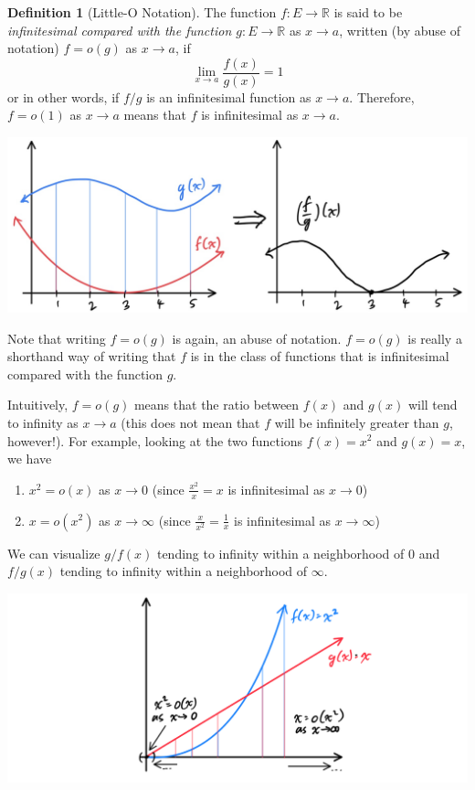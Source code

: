 \documentclass{article}
\theoremstyle{remark}
\theoremstyle{definition}
\newtheorem{definition}{Definition}[section]
\begin{document}
\begin{definition}[Little-O Notation]
The function $f: E \longrightarrow \mathbb{R}$ is said to be \textit{infinitesimal compared with the function $g: E \longrightarrow \mathbb{R}$} as $x \rightarrow a$, written (by abuse of notation) $f = o(g)$ as $x \rightarrow a$, if 
\[\lim_{x \rightarrow a} \frac{f(x)}{g(x)} = 1\]
or in other words, if $f/g$ is an infinitesimal function as $x \rightarrow a$. Therefore, $f = o(1)$ as $x \rightarrow a$ means that $f$ is infinitesimal as $x \rightarrow a$. 
\begin{center}
    \includegraphics[scale=0.25]{img/Little_o_Functions.jpg}
\end{center}
Note that writing $f = o(g)$ is again, an abuse of notation. $f = o(g)$ is really a shorthand way of writing that $f$ is in the class of functions that is infinitesimal compared with the function $g$. 
\end{definition}

Intuitively, $f = o(g)$ means that the ratio between $f(x)$ and $g(x)$ will tend to infinity as $x \rightarrow a$ (this does not mean that $f$ will be infinitely greater than $g$, however!). For example, looking at the two functions $f(x) = x^2$ and $g(x) = x$, we have 
\begin{enumerate}
    \item $x^2 = o(x)$ as $x \rightarrow 0$ (since $\frac{x^2}{x} = x$ is infinitesimal as $x \rightarrow 0$)
    \item $x = o(x^2)$ as $x \rightarrow \infty$ (since $\frac{x}{x^2} = \frac{1}{x}$ is infinitesimal as $x \rightarrow \infty$)
\end{enumerate}
We can visualize $g/f (x)$ tending to infinity within a neighborhood of $0$ and $f/g (x)$ tending to infinity within a neighborhood of $\infty$. 
\begin{center}
    \includegraphics[scale=0.25]{img/Comparison_of_Quadratic_and_Linear.PNG}
\end{center}
\end{document}
